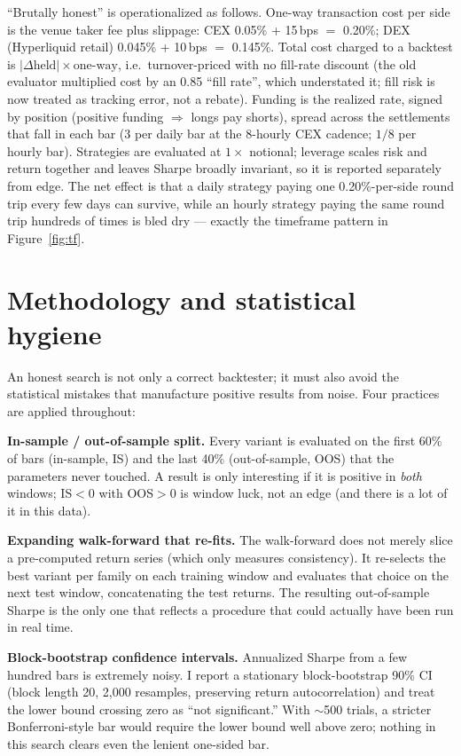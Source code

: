 \documentclass[11pt,a4paper]{article}
\begin{document}
``Brutally honest'' is operationalized as follows. One-way transaction cost per side is the venue taker fee plus slippage: CEX 0.05\% + 15\,bps $=$ 0.20\%; DEX (Hyperliquid retail) 0.045\% + 10\,bps $=$ 0.145\%. Total cost charged to a backtest is $|\Delta\text{held}|\times\text{one-way}$, i.e.\ turnover-priced with no fill-rate discount (the old evaluator multiplied cost by an 0.85 ``fill rate'', which understated it; fill risk is now treated as tracking error, not a rebate). Funding is the realized rate, signed by position (positive funding $\Rightarrow$ longs pay shorts), spread across the settlements that fall in each bar (3 per daily bar at the 8-hourly CEX cadence; $1/8$ per hourly bar). Strategies are evaluated at $1\times$ notional; leverage scales risk and return together and leaves Sharpe broadly invariant, so it is reported separately from edge. The net effect is that a daily strategy paying one 0.20\%-per-side round trip every few days can survive, while an hourly strategy paying the same round trip hundreds of times is bled dry --- exactly the timeframe pattern in Figure~\ref{fig:tf}.

\section{Methodology and statistical hygiene}

An honest search is not only a correct backtester; it must also avoid the statistical mistakes that manufacture positive results from noise. Four practices are applied throughout:

\textbf{In-sample / out-of-sample split.} Every variant is evaluated on the first 60\% of bars (in-sample, IS) and the last 40\% (out-of-sample, OOS) that the parameters never touched. A result is only interesting if it is positive in \emph{both} windows; IS$<$0 with OOS$>$0 is window luck, not an edge (and there is a lot of it in this data).

\textbf{Expanding walk-forward that re-fits.} The walk-forward does not merely slice a pre-computed return series (which only measures consistency). It re-selects the best variant per family on each training window and evaluates that choice on the next test window, concatenating the test returns. The resulting out-of-sample Sharpe is the only one that reflects a procedure that could actually have been run in real time.

\textbf{Block-bootstrap confidence intervals.} Annualized Sharpe from a few hundred bars is extremely noisy. I report a stationary block-bootstrap 90\% CI (block length 20, 2{,}000 resamples, preserving return autocorrelation) and treat the lower bound crossing zero as ``not significant.'' With $\sim$500 trials, a stricter Bonferroni-style bar would require the lower bound well above zero; nothing in this search clears even the lenient one-sided bar.
\end{document}
